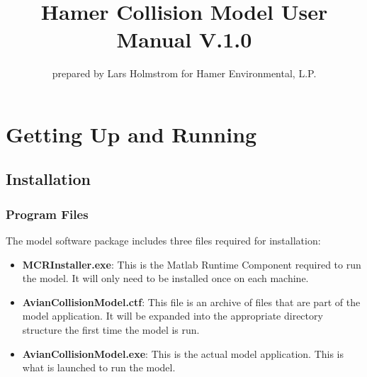 \documentclass[11pt,letterpaper,openany]{report}
\begin{document}


\title{Hamer Collision Model User Manual V.1.0}
\author{prepared by Lars Holmstrom for Hamer Environmental, L.P.}
\date{}
\maketitle

\tableofcontents

\chapter{Getting Up and Running}
\section{Installation}
\subsection{Program Files}
The model software package includes three files required for installation:
\begin{itemize}
  \item \textbf{MCRInstaller.exe}: This is the Matlab Runtime Component required to run the model. It will only need to be installed once on each machine.
  \item \textbf{AvianCollisionModel.ctf}: This file is an archive of files that are part of the model application. It will be expanded into the appropriate directory structure the first time the model is run.
  \item \textbf{AvianCollisionModel.exe}: This is the actual model application. This is what is launched to run the model.
\end{itemize}
\end{document}
